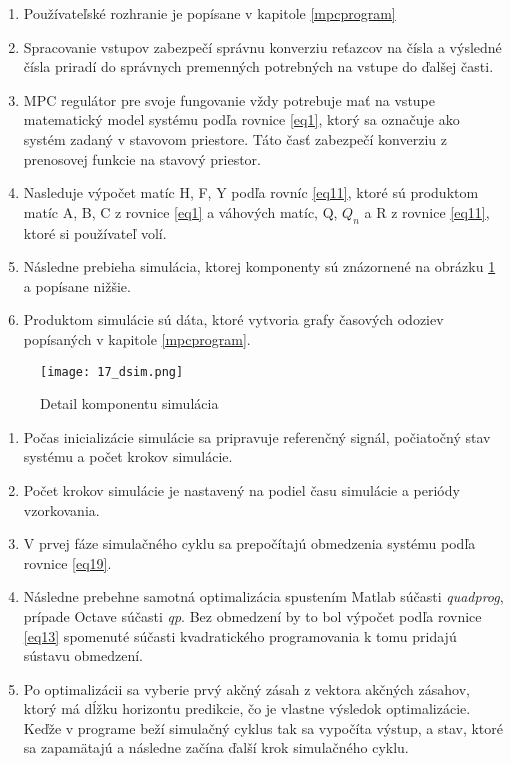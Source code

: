 \begin{enumerate}
  \item
    Používateľské rozhranie je popísane v kapitole \ref{mpcprogram}
  \item
    Spracovanie vstupov zabezpečí správnu konverziu reťazcov na čísla a výsledné čísla priradí do správnych premenných potrebných na vstupe do ďalšej časti.
  \item
    MPC regulátor pre svoje fungovanie vždy potrebuje mať na vstupe   matematický model systému podľa rovnice \ref{eq1}, ktorý sa označuje ako systém zadaný v stavovom priestore. Táto časť zabezpečí konverziu z prenosovej funkcie na stavový priestor.
  \item
   Nasleduje výpočet matíc H, F, Y podľa rovníc \ref{eq11}, ktoré sú produktom matíc A, B, C z rovnice \ref{eq1} a váhových matíc, Q, $Q_n$ a R z rovnice \ref{eq11}, ktoré si používateľ volí.
   \item
   Následne prebieha simulácia, ktorej komponenty sú znázornené na obrázku \ref{17_dsim} a popísane nižšie.
   \item
   Produktom simulácie sú dáta, ktoré vytvoria grafy časových odoziev popísaných v kapitole \ref{mpcprogram}.
\end{enumerate}

\begin{figure}[h]
\centering
\texttt{[image: 17\_dsim.png]}
\caption{Detail komponentu simulácia}
\label{17_dsim}
\end{figure}
\begin{enumerate}
  \item
	Počas inicializácie simulácie sa pripravuje referenčný signál, počiatočný stav systému a počet krokov simulácie.
  \item
    Počet krokov simulácie je nastavený na podiel času simulácie a periódy vzorkovania.
  \item
    V prvej fáze simulačného cyklu sa prepočítajú obmedzenia systému podľa rovnice \ref{eq19}.
  \item 
    Následne prebehne samotná optimalizácia spustením Matlab súčasti \textit{quadprog}, prípade Octave súčasti \textit{qp}. Bez obmedzení by to bol výpočet podľa rovnice \ref{eq13} spomenuté súčasti kvadratického programovania k tomu pridajú sústavu obmedzení.
  \item
    Po optimalizácii sa vyberie prvý akčný zásah z vektora akčných zásahov, ktorý má dĺžku horizontu predikcie, čo je vlastne výsledok optimalizácie. Keďže v programe beží simulačný cyklus tak sa vypočíta výstup, a stav, ktoré sa zapamätajú a následne začína ďalší krok simulačného cyklu.
\end{enumerate}


